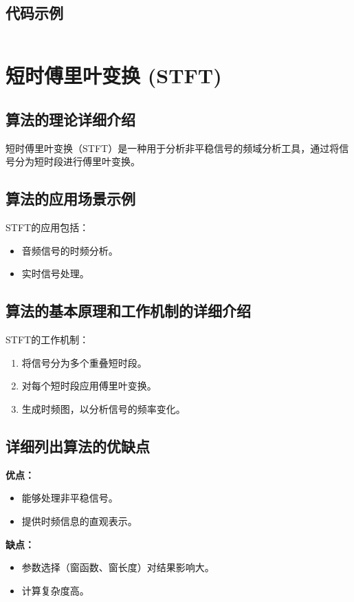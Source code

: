 \subsection*{代码示例}
\begin{lstlisting}

\end{lstlisting}


\section{短时傅里叶变换 (STFT)}
\subsection*{算法的理论详细介绍}
短时傅里叶变换（STFT）是一种用于分析非平稳信号的频域分析工具，通过将信号分为短时段进行傅里叶变换。

\subsection*{算法的应用场景示例}
STFT的应用包括：
\begin{itemize}
    \item 音频信号的时频分析。
    \item 实时信号处理。
\end{itemize}

\subsection*{算法的基本原理和工作机制的详细介绍}
STFT的工作机制：
\begin{enumerate}
    \item 将信号分为多个重叠短时段。
    \item 对每个短时段应用傅里叶变换。
    \item 生成时频图，以分析信号的频率变化。
\end{enumerate}

\subsection*{详细列出算法的优缺点}
\textbf{优点：}
\begin{itemize}
    \item 能够处理非平稳信号。
    \item 提供时频信息的直观表示。
\end{itemize}

\textbf{缺点：}
\begin{itemize}
    \item 参数选择（窗函数、窗长度）对结果影响大。
    \item 计算复杂度高。
\end{itemize}

